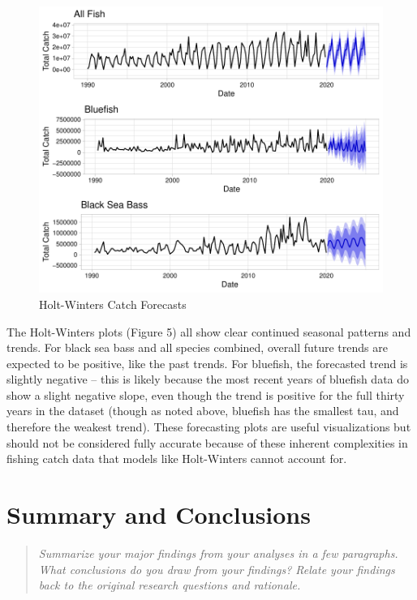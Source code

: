 \documentclass[
  12pt,
]{article}
\begin{document}
\begin{figure}[H]

\hfill{}\includegraphics{Report_FishTrends_files/figure-latex/unnamed-chunk-1-1} 

\caption{Holt-Winters Catch Forecasts}\label{fig:unnamed-chunk-1}
\end{figure}

The Holt-Winters plots (Figure 5) all show clear continued seasonal
patterns and trends. For black sea bass and all species combined,
overall future trends are expected to be positive, like the past trends.
For bluefish, the forecasted trend is slightly negative -- this is
likely because the most recent years of bluefish data do show a slight
negative slope, even though the trend is positive for the full thirty
years in the dataset (though as noted above, bluefish has the smallest
tau, and therefore the weakest trend). These forecasting plots are
useful visualizations but should not be considered fully accurate
because of these inherent complexities in fishing catch data that models
like Holt-Winters cannot account for.

\newpage

\hypertarget{summary-and-conclusions}{%
\section{Summary and Conclusions}\label{summary-and-conclusions}}

\begin{quote}
\emph{Summarize your major findings from your analyses in a few
paragraphs. What conclusions do you draw from your findings? Relate your
findings back to the original research questions and rationale.}
\end{quote}
\end{document}
